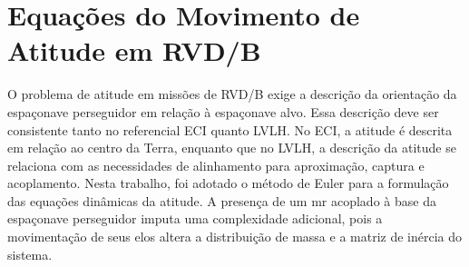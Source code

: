 \section{Equações do Movimento de Atitude em RVD/B}
\label{sec:equacoes_movimento_atitude}

O problema de atitude em missões de RVD/B exige a descrição da orientação da espaçonave perseguidor em relação à espaçonave alvo.
Essa descrição deve ser consistente tanto no referencial ECI quanto LVLH.
No ECI, a atitude é descrita em relação ao centro da Terra, enquanto que no LVLH, a descrição da atitude se relaciona com as necessidades de alinhamento para aproximação, captura e acoplamento.
Nesta trabalho, foi adotado o método de Euler para a formulação das equações dinâmicas da atitude.
A presença de um \gls{mr} acoplado à base da espaçonave perseguidor imputa uma complexidade adicional, pois a movimentação de seus elos altera a distribuição de massa e a matriz de inércia do sistema.




